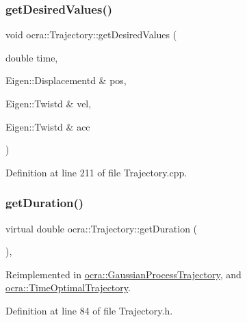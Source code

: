\subsubsection{\texorpdfstring{get\+Desired\+Values()}{getDesiredValues()}\hspace{0.1cm}{\footnotesize\ttfamily [6/6]}}
{\footnotesize\ttfamily void ocra\+::\+Trajectory\+::get\+Desired\+Values (\begin{DoxyParamCaption}\item[{double}]{time,  }\item[{Eigen\+::\+Displacementd \&}]{pos,  }\item[{Eigen\+::\+Twistd \&}]{vel,  }\item[{Eigen\+::\+Twistd \&}]{acc }\end{DoxyParamCaption})}



Definition at line 211 of file Trajectory.\+cpp.

\hypertarget{classocra_1_1Trajectory_ad65e4ce63f33d79d7880742035a64d6c}{}\label{classocra_1_1Trajectory_ad65e4ce63f33d79d7880742035a64d6c} 
\subsubsection{\texorpdfstring{get\+Duration()}{getDuration()}}
{\footnotesize\ttfamily virtual double ocra\+::\+Trajectory\+::get\+Duration (\begin{DoxyParamCaption}{ }\end{DoxyParamCaption})\hspace{0.3cm}{\ttfamily [inline]}, {\ttfamily [virtual]}}



Reimplemented in \hyperlink{classocra_1_1GaussianProcessTrajectory_a03444da89e14a8b77f76800c96d3bab2}{ocra\+::\+Gaussian\+Process\+Trajectory}, and \hyperlink{classocra_1_1TimeOptimalTrajectory_a561d2d6ad9c40c88783265a91193a0ab}{ocra\+::\+Time\+Optimal\+Trajectory}.



Definition at line 84 of file Trajectory.\+h.

\hypertarget{classocra_1_1Trajectory_ab86e41d3a59f9e9f9b06bf43928f7552}{}\label{classocra_1_1Trajectory_ab86e41d3a59f9e9f9b06bf43928f7552} 
